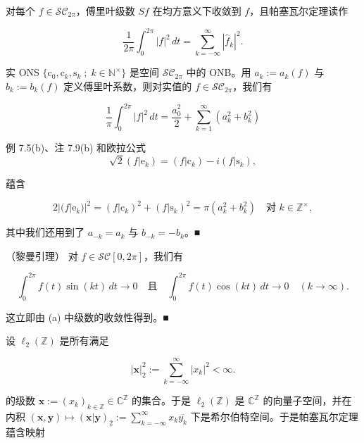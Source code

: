 \begin{corollary}

对每个 $ f \in \mathcal{SC}_{2\pi} $，傅里叶级数 $ Sf $ 在均方意义下收敛到 $ f $，且帕塞瓦尔定理读作

\[
\frac{1}{2\pi}\int_{0}^{2\pi}|f|^{2} \, dt = \sum_{k=-\infty}^{\infty}|\hat{f}_{k}|^{2} .
\]
\end{corollary}

\begin{remark}

\begin{items}
\item

实 ONS $ \{ \mathrm{c}_{0}, \mathrm{c}_{k}, \mathrm{s}_{k} \;;\; k \in \mathbb{N}^{\times} \} $ 是空间 $ \mathcal{SC}_{2\pi} $ 中的 ONB。用 $ a_{k} := a_{k}(f) $ 与 $ b_{k} := b_{k}(f) $ 定义傅里叶系数，则对实值的 $ f \in \mathcal{SC}_{2\pi} $，我们有

\[
\frac{1}{\pi}\int_{0}^{2\pi}|f|^{2} \, dt = \frac{a_{0}^{2}}{2} + \sum_{k=1}^{\infty}(a_{k}^{2} + b_{k}^{2})
\]

\proofhead
例 7.5(b)、注 7.9(b) 和欧拉公式
\[
\sqrt{2}(f|\mathrm{e}_{k}) = (f|\mathrm{c}_{k}) - i(f|\mathrm{s}_{k}) ,
\]

蕴含

\[
2|(f|\mathrm{e}_{k})|^{2} = (f|\mathrm{c}_{k})^{2} + (f|\mathrm{s}_{k})^{2} = \pi(a_{k}^{2} + b_{k}^{2}) \quad \text{对 } k \in \mathbb{Z}^{\times} ,
\]

其中我们还用到了 $ a_{-k} = a_{k} $ 与 $ b_{-k} = -b_{k} $。\nobreak\hspace{0.35em}■

\item

（黎曼引理）  对 $ f \in \mathcal{SC}[0, 2\pi] $，我们有

\[
\int_{0}^{2\pi} f(t)\sin(kt) \, dt \to 0 \quad \text{且} \quad \int_{0}^{2\pi} f(t)\cos(kt) \, dt \to 0 \quad (k \to \infty) .
\]

\proofhead
这立即由 (a) 中级数的收敛性得到。\nobreak\hspace{0.35em}■
\item

设 $ \ell_{2}(\mathbb{Z}) $ 是所有满足

\[
|\boldsymbol{x}|_{2}^{2} := \sum_{k=-\infty}^{\infty}|x_{k}|^{2} < \infty .
\]

的级数 $ \boldsymbol{x} := (x_{k})_{k \in \mathbb{Z}} \in \mathbb{C}^{\mathbb{Z}} $ 的集合。于是 $ \ell_{2}(\mathbb{Z}) $ 是 $ \mathbb{C}^{\mathbb{Z}} $ 的向量子空间，并在内积 $ (\boldsymbol{x}, \boldsymbol{y}) \mapsto (\boldsymbol{x}|\boldsymbol{y})_{2} := \sum_{k=-\infty}^{\infty} x_{k}\overline{y_{k}} $ 下是希尔伯特空间。于是帕塞瓦尔定理蕴含映射


\end{items}
\end{remark}
